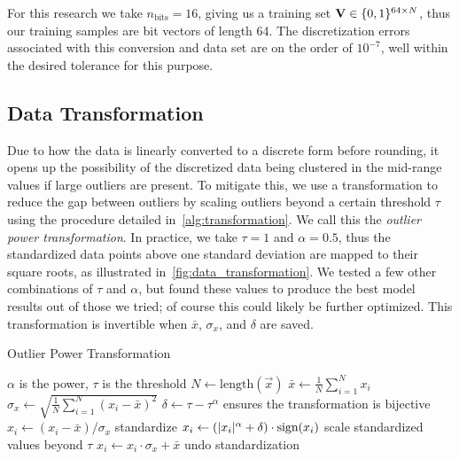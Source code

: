 For this research we take \( n_\text{bits} = 16 \), giving us a training set \( \mathbf{V} \in \{0,1\}^{64 \times N} \), thus our training samples are bit vectors of length 64.
The discretization errors associated with this conversion and data set are on the order of \( 10^{-7} \), well within the desired tolerance for this purpose.

\subsection{Data Transformation}\label{sec:outlier_transform}
Due to how the data is linearly converted to a discrete form before rounding, it opens up the possibility of the discretized data being clustered in the mid-range values if large outliers are present.
To mitigate this, we use a transformation to reduce the gap between outliers by scaling outliers beyond a certain threshold \( \tau \) using the procedure detailed in~\cref{alg:transformation}.
We call this the \textit{outlier power transformation}.
In practice, we take \( \tau = 1 \) and \( \alpha = 0.5 \), thus the standardized data points above one standard deviation are mapped to their square roots, as illustrated in~\cref{fig:data_transformation}.
We tested a few other combinations of \( \tau \) and \( \alpha \), but found these values to produce the best model results out of those we tried; of course this could likely be further optimized.
This transformation is invertible when \( \bar{x} \), \( \sigma_x \), and \( \delta \) are saved.

\begin{algorithm}
\caption{Outlier Power Transformation}
\begin{algorithmic}[1]
            \Comment $\alpha$ is the power, $\tau$ is the threshold
        \State $N \gets \text{length}(\vec{x})$
        \State $\bar{x} \gets \frac{1}{N} \sum_{i=1}^{N} x_i$
        \State $\sigma_{x} \gets \sqrt{\frac{1}{N} \sum_{i=1}^{N} (x_i - \bar{x})^2}$
        \State $\delta \gets \tau - \tau^\alpha$
            \Comment ensures the transformation is bijective
            \State $x_i \gets (x_i - \bar{x}) / \sigma_x$
                \Comment standardize
                \State $x_i \gets (\lvert x_i\rvert^\alpha + \delta) \cdot \text{sign}(x_i)$
                    \Comment scale standardized values beyond $\tau$
            \EndIf
            \State $x_i \gets x_i \cdot \sigma_x + \bar{x}$
                \Comment undo standardization
        \EndFor
    \EndProcedure
\end{algorithmic}
\label{alg:transformation}
\end{algorithm}

